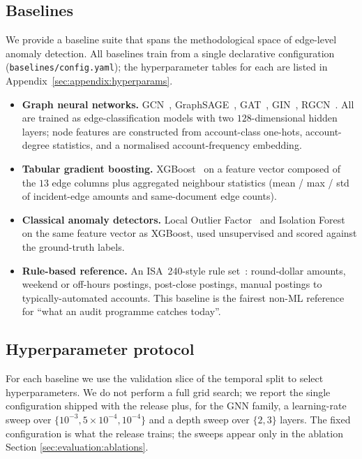 \subsection{Baselines}
\label{sec:evaluation:baselines}

We provide a baseline suite that spans the methodological space of
edge-level anomaly detection.  All baselines train from a single
declarative configuration (\texttt{baselines/config.yaml}); the
hyperparameter tables for each are listed in
Appendix~\ref{sec:appendix:hyperparams}.

\begin{itemize}
  \item \textbf{Graph neural networks.}
    GCN~\citep{kipf2017semi},
    GraphSAGE~\citep{hamilton2017inductive},
    GAT~\citep{velickovic2018graph},
    GIN~\citep{xu2019gin},
    RGCN~\citep{schlichtkrull2018rgcn}.  All are trained as
    edge-classification models with two $128$-dimensional
    hidden layers; node features are constructed from
    account-class one-hots, account-degree statistics, and a
    normalised account-frequency embedding.
  \item \textbf{Tabular gradient boosting.}
    XGBoost~\citep{chen2016xgboost} on a feature vector
    composed of the $13$ edge columns plus aggregated
    neighbour statistics (mean / max / std of incident-edge
    amounts and same-document edge counts).
  \item \textbf{Classical anomaly detectors.}
    Local Outlier Factor~\citep{breunig2000lof} and
    Isolation Forest~\citep{liu2008isolation} on the same
    feature vector as XGBoost, used unsupervised and scored
    against the ground-truth labels.
  \item \textbf{Rule-based reference.}  An ISA~240-style rule
    set~\citep{isa240}: round-dollar amounts, weekend or
    off-hours postings, post-close postings, manual postings to
    typically-automated accounts.  This baseline is the
    fairest non-ML reference for ``what an audit programme
    catches today''.
\end{itemize}

\subsection{Hyperparameter protocol}
\label{sec:evaluation:hp}

For each baseline we use the validation slice of the temporal
split to select hyperparameters.  We do not perform a full grid
search; we report the single configuration shipped with the
release plus, for the GNN family, a learning-rate sweep over
$\{10^{-3}, 5\!\times\!10^{-4}, 10^{-4}\}$ and a depth sweep over
$\{2, 3\}$ layers.  The fixed configuration is what the release
trains; the sweeps appear only in the ablation Section
\ref{sec:evaluation:ablations}.

